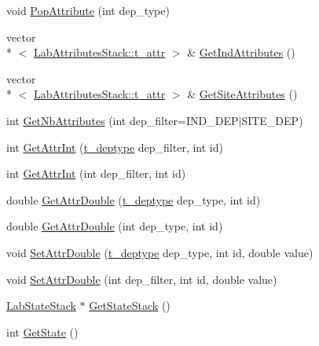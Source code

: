 \begin{DoxyCompactItemize}
\item 
void \hyperlink{classelps_1_1_lab_site_base_ae85ef5ced5137b26ef4fd970cb34a420}{Pop\+Attribute} (int dep\+\_\+type)
\item 
vector\\*
$<$ \hyperlink{structelps_1_1_lab_attributes_stack_1_1t__attr}{Lab\+Attributes\+Stack\+::t\+\_\+attr} $>$ \& \hyperlink{classelps_1_1_lab_site_base_a6f6d8a4adf1c8a0dd64e24f292f3d614}{Get\+Ind\+Attributes} ()
\item 
vector\\*
$<$ \hyperlink{structelps_1_1_lab_attributes_stack_1_1t__attr}{Lab\+Attributes\+Stack\+::t\+\_\+attr} $>$ \& \hyperlink{classelps_1_1_lab_site_base_a0f09601f867b0655cbb2162e9356f6c2}{Get\+Site\+Attributes} ()
\item 
int \hyperlink{classelps_1_1_lab_site_base_a0050970ea50d9c03f8f1297193dccfb3}{Get\+Nb\+Attributes} (int dep\+\_\+filter=I\+N\+D\+\_\+\+D\+E\+P$\vert$S\+I\+T\+E\+\_\+\+D\+E\+P)
\item 
int \hyperlink{classelps_1_1_lab_site_base_ac7decdfd372543844809b7ea9e6dad23}{Get\+Attr\+Int} (\hyperlink{classelps_1_1_lab_site_base_a8ec08fafa015dfa53827d985608afe58}{t\+\_\+deptype} dep\+\_\+filter, int id)
\item 
int \hyperlink{classelps_1_1_lab_site_base_a96a94149e72089742cf2d3b28bcea9fd}{Get\+Attr\+Int} (int dep\+\_\+filter, int id)
\item 
double \hyperlink{classelps_1_1_lab_site_base_a255927dd021939962f30cd133c8c7314}{Get\+Attr\+Double} (\hyperlink{classelps_1_1_lab_site_base_a8ec08fafa015dfa53827d985608afe58}{t\+\_\+deptype} dep\+\_\+type, int id)
\item 
double \hyperlink{classelps_1_1_lab_site_base_a33f15543d7871b9b765e3da074fb97dd}{Get\+Attr\+Double} (int dep\+\_\+type, int id)
\item 
void \hyperlink{classelps_1_1_lab_site_base_a60dd270b7d88b505c87df6fa56745fed}{Set\+Attr\+Double} (\hyperlink{classelps_1_1_lab_site_base_a8ec08fafa015dfa53827d985608afe58}{t\+\_\+deptype} dep\+\_\+type, int id, double value)
\item 
void \hyperlink{classelps_1_1_lab_site_base_a4f35ab29b854a93a86a08703aef19f97}{Set\+Attr\+Double} (int dep\+\_\+filter, int id, double value)
\item 
\hyperlink{classelps_1_1_lab_state_stack}{Lab\+State\+Stack} $\ast$ \hyperlink{classelps_1_1_lab_site_base_a2dc92ba97f028625504bfef9a009a655}{Get\+State\+Stack} ()
\item 
int \hyperlink{classelps_1_1_lab_site_base_a825a6fd314de22c041395520dcb5275b}{Get\+State} ()

\end{DoxyCompactItemize}
